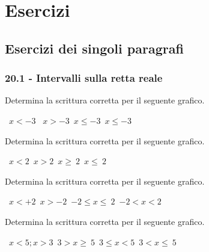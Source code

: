 
\section{Esercizi}
\subsection{Esercizi dei singoli paragrafi}
\subsubsection*{20.1 - Intervalli sulla retta reale}

\begin{esercizio}
 \label{ese:20.1}
 Determina la scrittura corretta per il seguente grafico.
 \begin{center}
  

 \boxA\quad~$x<-3$ \quad\boxB\quad~$x>-3$\quad\boxC\quad~$x\le -3$\quad\boxD\quad~$x\le -3$
 \end{center}

\end{esercizio}

\begin{esercizio}
 \label{ese:20.2}
 Determina la scrittura corretta per il seguente grafico.
  \begin{center}
  

\boxA\quad~$x<2$\quad\boxB\quad~$x>2$\quad\boxC\quad~$x\ge~2$\quad\boxD\quad~$x\le~2$
 \end{center}
\end{esercizio}

\begin{esercizio}
 \label{ese:20.3}
 Determina la scrittura corretta per il seguente grafico.
  \begin{center}
  

\boxA\quad~$x<+2$\quad\boxB\quad~$x>-2$\quad\boxC\quad~$-2\le x\le~2$\quad\boxD\quad~$-2<x<2$
 \end{center}
\end{esercizio}

\begin{esercizio}
 \label{ese:20.4}
 Determina la scrittura corretta per il seguente grafico.
  \begin{center}
  

  \boxA\quad~$x<5;x>3$\quad\boxB\quad~$3>x\ge~5$\quad\boxC\quad~$3\le x<5$\quad\boxD\quad~$3<x\le~5$
 \end{center}
  \end{esercizio}

